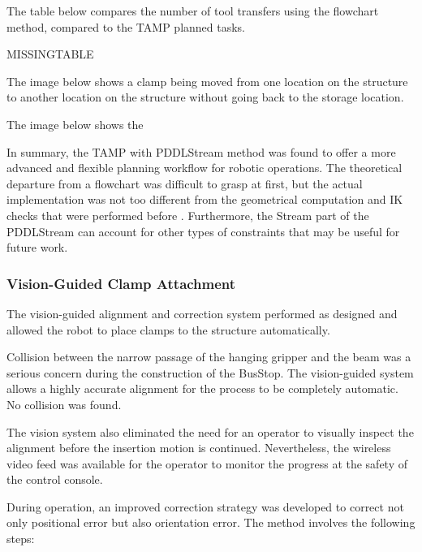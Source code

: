 The table below compares the number of tool transfers using the flowchart method, compared to the TAMP planned tasks.


MISSINGTABLE

The image below shows a clamp being moved from one location on the structure to another location on the structure without going back to the storage location.




The image below shows the 




In summary, the TAMP with PDDLStream method was found to offer a more advanced and flexible planning workflow for robotic operations. The theoretical departure from a flowchart was difficult to grasp at first, but the actual implementation was not too different from the geometrical computation and IK checks that were performed before . Furthermore, the Stream part of the PDDLStream can account for other types of constraints that may be useful for future work. 

\subsubsection{Vision-Guided Clamp Attachment}
\label{subsubsection:exploration_5_vision_guided_clamp_attachment}

The vision-guided alignment and correction system performed as designed and allowed the robot to place clamps to the structure automatically. 

Collision between the narrow passage of the hanging gripper and the beam was a serious concern during the construction of the BusStop. The vision-guided system allows a highly accurate alignment for the process to be completely automatic. No collision was found.

The vision system also eliminated the need for an operator to visually inspect the alignment before the insertion motion is continued. Nevertheless, the wireless video feed was available for the operator to monitor the progress at the safety of the control console.

During operation, an improved correction strategy was developed to correct not only positional error but also orientation error. The method involves the following steps:

